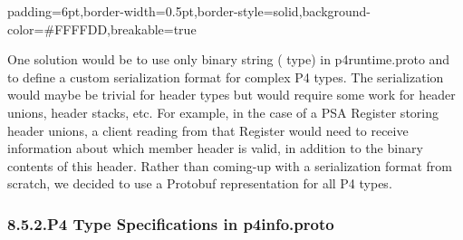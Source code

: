 \documentclass[11pt]{article}
\begin{document}
{%
\begin{mdbmargintb}{6pt}{6pt}%
\begin{mdblock}{padding=6pt,border-width=0.5pt,border-style=solid,background-color=\#FFFFDD,breakable=true}%
\begin{mdpre}%
\end{mdpre}%
\end{mdblock}%
\end{mdbmargintb}%

\noindent{}One solution would be to use only binary string ( type) in
p4runtime.proto and to define a custom serialization format for complex P4
types. The serialization would maybe be trivial for header types but would
require some work for header unions, header stacks, etc. For example, in the
case of a PSA Register storing header unions, a client reading from that
Register would need to receive information about which member header is valid,
in addition to the binary contents of this header. Rather than coming-up with a
serialization format from scratch, we decided to use a Protobuf representation
for all P4 types.%

\subsubsection{8.5.2.\hspace*{0.5em}P4 Type Specifications in p4info.proto}\label{sec-p4-type-specifications-in-p4infoproto}%

}
\end{document}
